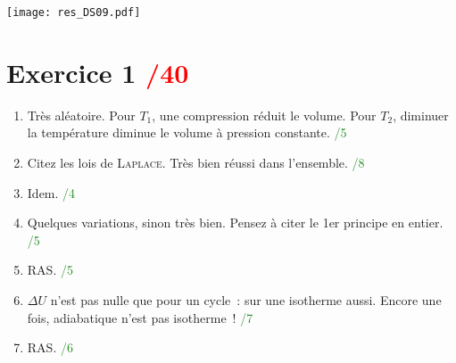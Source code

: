 \documentclass[a4paper, 11pt, final, garamond]{book}
\begin{document}
\begin{center}
	\texttt{[image: res\_DS09.pdf]}
\end{center}
\vspace*{-20pt}

\section{Exercice 1 \hfill \textcolor{red}{/40}}
\begin{enumerate}
	\item Très aléatoire. Pour $T_1$, une compression réduit le volume. Pour
	      $T_2$, diminuer la température diminue le volume à pression constante.
	      \hfill \textcolor{ForestGreen}{/5}
	\item Citez les lois de \textsc{Laplace}. Très bien réussi dans l'ensemble.
	      \hfill \textcolor{ForestGreen}{/8}
	\item Idem.
	      \hfill \textcolor{ForestGreen}{/4}
	\item Quelques variations, sinon très bien. Pensez à citer le 1er principe en
	      entier.
	      \hfill \textcolor{ForestGreen}{/5}
	\item RAS.
	      \hfill \textcolor{ForestGreen}{/5}
	\item $\Delta{U}$ n'est pas nulle que pour un cycle~: sur une isotherme aussi.
	      Encore une fois, adiabatique n'est pas isotherme~!
	      \hfill \textcolor{ForestGreen}{/7}
	\item RAS.
	      \hfill \textcolor{ForestGreen}{/6}
\end{enumerate}
\end{document}
